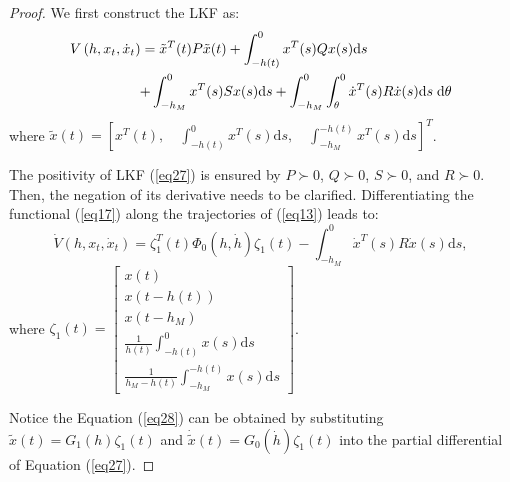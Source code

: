 \documentclass[a4paper]{cas-sc}
\newtheorem*{proof}{Proof}
\begin{document}
\begin{proof}
  We first construct the LKF as:
  \begin{equation}
    \label{eq27}
    \begin{gathered}
      V\left( {h,{x_t},{{\dot x}_t}} \right) = {{\tilde x}^T}(t)P\tilde x(t) + \int_{ - h(t)}^0 {{x^T}} (s)Qx(s){\text{d}}s \hfill \\
      \quad \quad \quad \quad \quad  + \int_{ - {h_M}}^0 {{x^T}} (s)Sx(s){\text{d}}s + \int_{ - {h_M}}^0 {\int_\theta ^0 {{{\dot x}^T}(s)R\dot x(s){\text{d}}s\;{\text{d}}\theta } }  \hfill \\
    \end{gathered}
  \end{equation}
  where $ \tilde x(t) = {\left[ {{x^T}(t),\quad \int_{ - h(t)}^0 {{x^T}} (s){\text{d}}s,\quad \int_{ - {h_M}}^{ - h(t)} {{x^T}} (s){\text{d}}s} \right]^T} $.

  The positivity of LKF (\ref{eq27}) is ensured by $ P \succ 0 $, $ Q \succ 0 $, $ S \succ 0 $, and $ R \succ 0 $. Then, the negation of its derivative needs to be clarified. Differentiating the functional (\ref{eq17}) along the trajectories of (\ref{eq13}) leads to:
  \begin{equation}
    \label{eq28}
    \dot V\left( {h,{x_t},{{\dot x}_t}} \right) = \zeta _1^T(t){\Phi _0}(h,\dot h){\zeta _1}(t) - \int_{ - {h_M}}^0 {{{\dot x}^T}} (s)R\dot x(s){\text{d}}s,
  \end{equation}
  where $ {\zeta _1}(t) = \left[ {\begin{array}{*{20}{c}}
            {x(t)}                                              \\
            {x(t - h(t))}                                       \\
            {x\left( {t - {h_M}} \right)}                       \\
            {\frac{1}{{h(t)}}\int_{ - h(t)}^0 x (s){\text{d}}s} \\
            {\frac{1}{{{h_M} - h(t)}}\int_{ - {h_M}}^{ - h(t)} x (s){\text{d}}s}
          \end{array}} \right] $.

  Notice the Equation (\ref{eq28}) can be obtained by substituting $ \tilde x(t) = {G_1}(h){\zeta _1}(t) $ and $ \dot {\tilde x}(t) = {G_0}(\dot h){\zeta _1}(t) $ into the partial differential of Equation (\ref{eq27}).


\end{proof}
\end{document}
